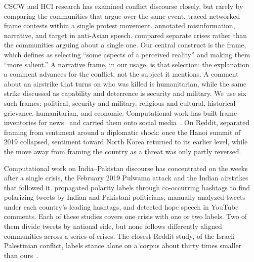CSCW and HCI research has examined conflict discourse closely, but rarely by comparing the communities that argue over the same event. \citet{stewart2017lines} traced networked frame contests within a single protest movement. \citet{zhou2025harm} annotated misinformation, narrative, and target in anti-Asian speech. \citet{olteanu2015crisis} compared separate crises rather than the communities arguing about a single one.  Our central construct is the frame, which \citet{entman1993framing} defines as selecting ``some aspects of a perceived reality'' and making them ``more salient.''
 A narrative frame, in our usage, is that selection: the explanation a comment advances for the conflict, not the subject it mentions. A comment about an airstrike that turns on who was killed is humanitarian, while the same strike discussed as capability and deterrence is security and military. We use six such frames: political, security and military, religious and cultural, historical grievance, humanitarian, and economic. Computational work has built frame inventories for news~\cite{card2015mediaframes} and carried them onto social media~\cite{mendelsohn2021framing}. On Reddit, \citet{shin2026diplomacy} separated framing from sentiment around a diplomatic shock: once the Hanoi summit of 2019 collapsed, sentiment toward North Korea returned to its earlier level, while the move away from framing the country as a threat was only partly reversed.


Computational work on India--Pakistan discourse has concentrated on the weeks after a single crisis, the February 2019 Pulwama attack and the Indian airstrikes that followed it. \citet{tyagi2020ipconflict} propagated polarity labels through co-occurring hashtags to find polarizing tweets by Indian and Pakistani politicians, \citet{hussain2021pulwama} manually analyzed tweets under each country's leading hashtags, and \citet{palakodety2020hope} detected hope speech in YouTube comments. Each of these studies covers one crisis with one or two labels. Two of them divide tweets by national side, but none follows differently aligned communities across a series of crises. The closest Reddit study, of the Israeli--Palestinian conflict, labels stance alone on a corpus about thirty times smaller than ours~\cite{ali2025stance}.


